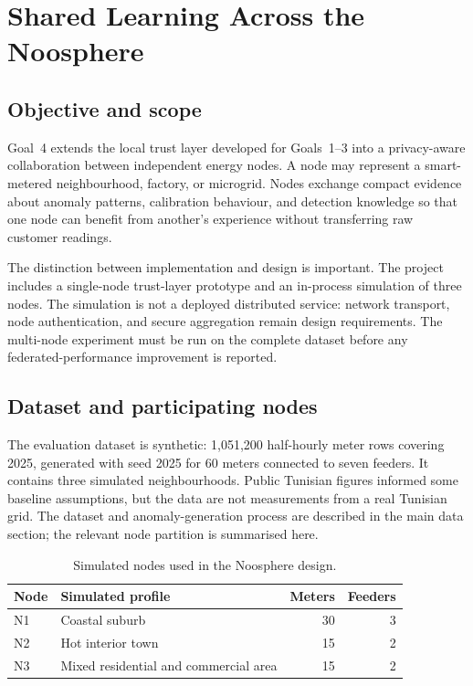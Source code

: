 
\section{Shared Learning Across the Noosphere}
\label{sec:goal4-shared}

\subsection{Objective and scope}
Goal~4 extends the local trust layer developed for Goals~1--3 into a privacy-aware collaboration between independent energy nodes. A node may represent a smart-metered neighbourhood, factory, or microgrid. Nodes exchange compact evidence about anomaly patterns, calibration behaviour, and detection knowledge so that one node can benefit from another's experience without transferring raw customer readings.

The distinction between implementation and design is important. The project includes a single-node trust-layer prototype and an in-process simulation of three nodes. The simulation is not a deployed distributed service: network transport, node authentication, and secure aggregation remain design requirements. The multi-node experiment must be run on the complete dataset before any federated-performance improvement is reported.

\subsection{Dataset and participating nodes}
The evaluation dataset is synthetic: 1,051,200 half-hourly meter rows covering 2025, generated with seed 2025 for 60 meters connected to seven feeders. It contains three simulated neighbourhoods. Public Tunisian figures informed some baseline assumptions, but the data are not measurements from a real Tunisian grid. The dataset and anomaly-generation process are described in the main data section; the relevant node partition is summarised here.

\begin{table}[htbp]
\centering
\small
\caption{Simulated nodes used in the Noosphere design.}
\label{tab:goal4-nodes}
\begin{tabularx}{\textwidth}{@{}l X r r@{}}
\toprule
Node & Simulated profile & Meters & Feeders \\
\midrule
N1 & Coastal suburb & 30 & 3 \\
N2 & Hot interior town & 15 & 2 \\
N3 & Mixed residential and commercial area & 15 & 2 \\
\bottomrule
\end{tabularx}
\end{table}

